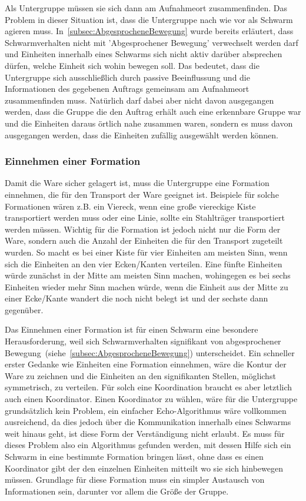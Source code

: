 Als Untergruppe müssen sie sich dann am Aufnahmeort zusammenfinden.
Das Problem in dieser Situation ist, dass die Untergruppe nach wie vor als Schwarm agieren muss.
In~\autoref{subsec:AbgesprocheneBewegung} wurde bereits erläutert, dass Schwarmverhalten nicht mit 'Abgesprochener Bewegung' verwechselt werden darf und Einheiten innerhalb eines Schwarms sich nicht aktiv darüber absprechen dürfen, welche Einheit sich wohin bewegen soll.
Das bedeutet, dass die Untergruppe sich ausschließlich durch passive Beeinflussung und die Informationen des gegebenen Auftrags gemeinsam am Aufnahmeort zusammenfinden muss.
Natürlich darf dabei aber nicht davon ausgegangen werden, dass die Gruppe die den Auftrag erhält auch eine erkennbare Gruppe war und die Einheiten daraus örtlich nahe zusammen waren, sondern es muss davon ausgegangen werden, dass die Einheiten zufällig ausgewählt werden können.

\subsubsection*{Einnehmen einer Formation}
Damit die Ware sicher gelagert ist, muss die Untergruppe eine Formation einnehmen, die für den Transport der Ware geeignet ist.
Beispiele für solche Formationen wären z.B. ein Viereck, wenn eine große viereckige Kiste transportiert werden muss oder eine Linie, sollte ein Stahlträger transportiert werden müssen.
Wichtig für die Formation ist jedoch nicht nur die Form der Ware, sondern auch die Anzahl der Einheiten die für den Transport zugeteilt wurden.
So macht es bei einer Kiste für vier Einheiten am meisten Sinn, wenn sich die Einheiten an den vier Ecken/Kanten verteilen.
Eine fünfte Einheiten würde zunächst in der Mitte am meisten Sinn machen, wohingegen es bei sechs Einheiten wieder mehr Sinn machen würde, wenn die Einheit aus der Mitte zu einer Ecke/Kante wandert die noch nicht belegt ist und der sechste dann gegenüber.

Das Einnehmen einer Formation ist für einen Schwarm eine besondere Herausforderung, weil sich Schwarmverhalten signifikant von abgesprochener Bewegung~(siehe~\autoref{subsec:AbgesprocheneBewegung}) unterscheidet.
Ein schneller erster Gedanke wie Einheiten eine Formation einnehmen, wäre die Kontur der Ware zu zeichnen und die Einheiten an den signifikanten Stellen, möglichst symmetrisch, zu verteilen.
Für solch eine Koordination braucht es aber letztlich auch einen Koordinator.
Einen Koordinator zu wählen, wäre für die Untergruppe grundsätzlich kein Problem, ein einfacher Echo-Algorithmus wäre vollkommen ausreichend, da dies jedoch über die Kommunikation innerhalb eines Schwarms weit hinaus geht, ist diese Form der Verständigung nicht erlaubt.
Es muss für dieses Problem also ein Algorithmus gefunden werden, mit dessen Hilfe sich ein Schwarm in eine bestimmte Formation bringen lässt, ohne dass es einen Koordinator gibt der den einzelnen Einheiten mitteilt wo sie sich hinbewegen müssen.
Grundlage für diese Formation muss ein simpler Austausch von Informationen sein, darunter vor allem die Größe der Gruppe.


